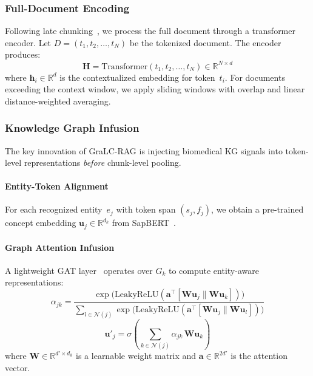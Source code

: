 \documentclass[sn-basic]{sn-jnl}
\newcommand{\gralcrag}{GraLC-RAG}
\begin{document}
\subsubsection{Full-Document Encoding}\label{sec:encoding}

Following late chunking~\cite{gunther2024late}, we process the full document through a transformer encoder. Let $D = (t_1, t_2, \ldots, t_N)$ be the tokenized document. The encoder produces:
\begin{equation}
  \mathbf{H} = \text{Transformer}(t_1, t_2, \ldots, t_N) \in \mathbb{R}^{N \times d}
\end{equation}
where $\mathbf{h}_i \in \mathbb{R}^d$ is the contextualized embedding for token~$t_i$. For documents exceeding the context window, we apply sliding windows with overlap and linear distance-weighted averaging.

\subsubsection{Knowledge Graph Infusion}\label{sec:kg-infusion}

The key innovation of \gralcrag{} is injecting biomedical KG signals into token-level representations \emph{before} chunk-level pooling.

\paragraph{Entity-Token Alignment}
For each recognized entity~$e_j$ with token span $(s_j, f_j)$, we obtain a pre-trained concept embedding $\mathbf{u}_j \in \mathbb{R}^{d_k}$ from SapBERT~\cite{liu2021self}.

\paragraph{Graph Attention Infusion}
A lightweight GAT layer~\cite{velickovic2018graph} operates over $G_k$ to compute entity-aware representations:
\begin{equation}
  \alpha_{jk} = \frac{\exp\!\big(\text{LeakyReLU}(\mathbf{a}^{\!\top}\![\mathbf{W}\mathbf{u}_j \| \mathbf{W}\mathbf{u}_k])\big)}{\sum_{l \in \mathcal{N}(j)} \exp\!\big(\text{LeakyReLU}(\mathbf{a}^{\!\top}\![\mathbf{W}\mathbf{u}_j \| \mathbf{W}\mathbf{u}_l])\big)}
\end{equation}
\begin{equation}
  \mathbf{u}'_j = \sigma\!\left(\sum_{k \in \mathcal{N}(j)} \alpha_{jk}\, \mathbf{W}\mathbf{u}_k\right)
\end{equation}
where $\mathbf{W} \in \mathbb{R}^{d' \times d_k}$ is a learnable weight matrix and $\mathbf{a} \in \mathbb{R}^{2d'}$ is the attention vector.
\end{document}
